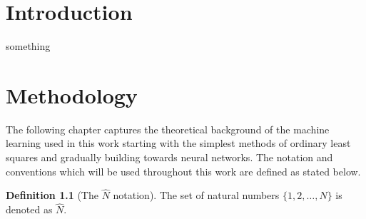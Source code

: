 \documentclass[11pt,american]{book} %
\theoremstyle{plain}
\theoremstyle{definition}
\newtheorem{defn}{Definition}
\begin{document}


\tableofcontents{}

\chapter*{Introduction}


something

\chapter{Methodology}
The following chapter captures the theoretical background of the machine learning used in this work starting with the simplest methods of ordinary least squares and gradually building towards neural networks. The notation and conventions which will be used throughout this work are defined as stated below.

\begin{defn}[{The $\hat{N}$ notation}]
	The set of natural numbers $\{1, 2, \dots, N\}$ is denoted as $\hat{N}$.
\end{defn}
\end{document}
